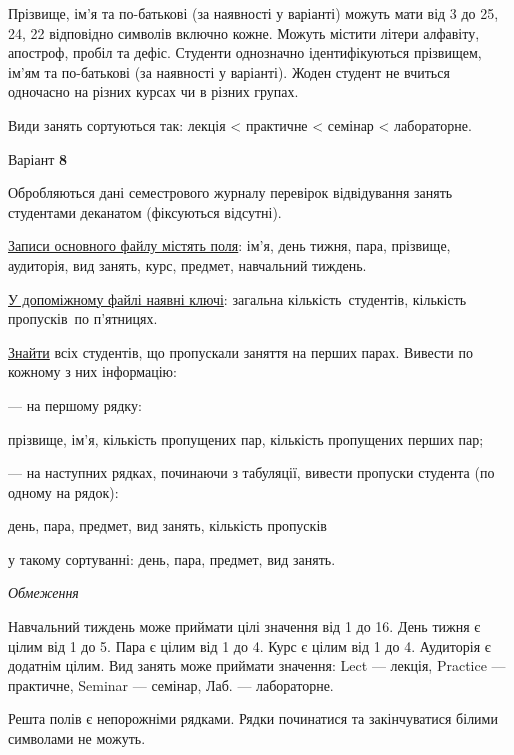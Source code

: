 \documentclass[11pt, ukrainian]{article}
\begin{document}
Прізвище, ім’я та по-батькові (за наявності у варіанті)
можуть мати від 3 до 25, 24, 22 відповідно символів включно кожне.
Можуть містити літери алфавіту, апостроф, пробіл та дефіс.
Студенти однозначно ідентифікуються прізвищем, ім’ям та по-батькові (за наявності у варіанті).
Жоден студент не вчиться одночасно на різних курсах чи в різних групах.

Види занять сортуються так: лекція < практичне < семінар < лабораторне.



\par
\newpage
{\center Варіант  \No \textbf { 8 }\par}
\bigskip
Обробляються дані семестрового журналу перевірок відвідування занять студентами деканатом (фіксуються відсутні). 

\underline{Записи основного файлу містять поля}: ім’я, день тижня, пара, прізвище, аудиторія, вид занять, курс, предмет, навчальний тиждень.

\underline{У допоміжному файлі наявні ключі}: загальна кількість\ студентів, кількість пропусків\ по п’ятни\-цях.

\underline{Знайти} всіх студентів, що пропускали заняття на перших парах. Вивести по кожному з них інформацію:\par
{\noindent}--- на першому рядку:\par
прізвище, ім’я, кількість пропущених пар, кількість пропущених перших пар;

{\noindent}--- на наступних рядках, починаючи з табуляції, вивести пропуски студента (по одному на рядок):\par
день, пара, предмет, вид занять, кількість пропусків

{\noindent}у такому сортуванні: день, пара, предмет, вид занять.


\bigskip\textit{Обмеження}

Навчальний тиждень може приймати цілі значення від 1 до 16.
День тижня є цілим від 1 до 5. Пара є цілим від 1 до 4.
Курс є цілим від 1 до 4. Аудиторія є додатнім цілим.
Вид занять може приймати значення:
Lect --- лекція, Practice --- практичне, Seminar --- семінар, Лаб. --- лабораторне.

Решта полів є непорожніми рядками.
Рядки починатися та закінчуватися білими символами не можуть.
\end{document}
